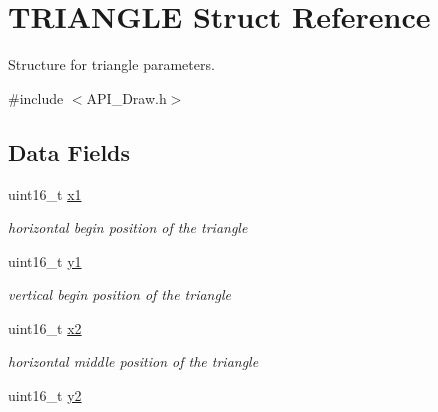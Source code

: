 \hypertarget{struct_t_r_i_a_n_g_l_e}{}\section{T\+R\+I\+A\+N\+G\+LE Struct Reference}
\label{struct_t_r_i_a_n_g_l_e}


Structure for triangle parameters.  




{\ttfamily \#include $<$A\+P\+I\+\_\+\+Draw.\+h$>$}

\subsection*{Data Fields}
\begin{DoxyCompactItemize}
\item 
\mbox{\label{struct_t_r_i_a_n_g_l_e_aedb5fdfe3c1d1a915b668ba7f3950753}} 
uint16\+\_\+t \hyperlink{struct_t_r_i_a_n_g_l_e_aedb5fdfe3c1d1a915b668ba7f3950753}{x1}
\begin{DoxyCompactList}\small\item\em horizontal begin position of the triangle \end{DoxyCompactList}\item 
\mbox{\label{struct_t_r_i_a_n_g_l_e_a47ada631c22a9d40348069145654f255}} 
uint16\+\_\+t \hyperlink{struct_t_r_i_a_n_g_l_e_a47ada631c22a9d40348069145654f255}{y1}
\begin{DoxyCompactList}\small\item\em vertical begin position of the triangle \end{DoxyCompactList}\item 
\mbox{\label{struct_t_r_i_a_n_g_l_e_ac5bc000f8954f38b7a641a485a26bae7}} 
uint16\+\_\+t \hyperlink{struct_t_r_i_a_n_g_l_e_ac5bc000f8954f38b7a641a485a26bae7}{x2}
\begin{DoxyCompactList}\small\item\em horizontal middle position of the triangle \end{DoxyCompactList}\item 
\mbox{\label{struct_t_r_i_a_n_g_l_e_aa377184ba406b3f0c4ac18c935378204}} 
uint16\+\_\+t \hyperlink{struct_t_r_i_a_n_g_l_e_aa377184ba406b3f0c4ac18c935378204}{y2}

\end{DoxyCompactItemize}
